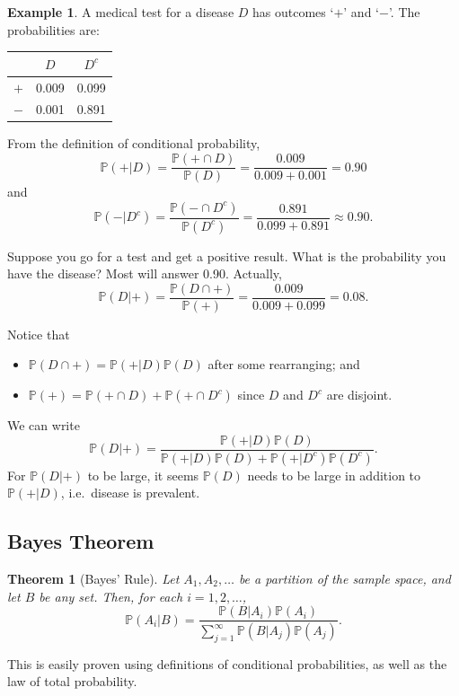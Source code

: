 \documentclass[
]{book}
\providecommand{\tightlist}{%
  \setlength{\itemsep}{0pt}\setlength{\parskip}{0pt}}
\newcommand{\bbP}{\mathbb{P}}
\newtheorem{theorem}{Theorem}[chapter]
\theoremstyle{definition}
\theoremstyle{definition}
\newtheorem{example}{Example}[chapter]
\theoremstyle{definition}
\theoremstyle{definition}
\theoremstyle{remark}
\begin{document}
\begin{example}
A medical test for a disease \(D\) has outcomes `\(+\)' and `\(-\)'. The probabilities are:

\begin{longtable}[]{@{}lcc@{}}
\toprule
& \(D\) & \(D^c\) \\
\midrule
\endhead
\(+\) & 0.009 & 0.099 \\
\(-\) & 0.001 & 0.891 \\
\bottomrule
\end{longtable}

From the definition of conditional probability,
\[
  \bbP(+|D) = \frac{\bbP(+ \cap D)}{\bbP(D)} = \frac{0.009}{0.009 + 0.001} = 0.90
\]
and
\[
  \bbP(-|D^c) = \frac{\bbP(- \cap D^c)}{\bbP(D^c)} = \frac{0.891}{0.099 + 0.891} \approx 0.90.
\]

Suppose you go for a test and get a positive result.
What is the probability you have the disease?
Most will answer 0.90.
Actually,
\[
  \bbP(D|+) = \frac{\bbP(D \cap +)}{\bbP(+)} = \frac{0.009}{0.009 + 0.099} = 0.08.
\]
\end{example}

Notice that

\begin{itemize}
\tightlist
\item
  \(\bbP(D \cap +) = \bbP(+|D)\bbP(D)\) after some rearranging; and
\item
  \(\bbP(+) = \bbP(+ \cap D) + \bbP(+ \cap D^c)\) since \(D\) and \(D^c\) are disjoint.
\end{itemize}

We can write
\[
\bbP(D|+) = \frac{\bbP(+|D)\bbP(D)}{\bbP(+|D)\bbP(D) + \bbP(+|D^c)\bbP(D^c)}.
\]
For \(\bbP(D|+)\) to be large, it seems \(\bbP(D)\) needs to be large in addition to \(\bbP(+|D)\), i.e.~disease is prevalent.

\hypertarget{bayes-theorem}{%
\subsection{Bayes Theorem}\label{bayes-theorem}}

\begin{theorem}[Bayes' Rule]
Let \(A_1,A_2,\dots\) be a partition of the sample space, and let \(B\) be any set.
Then, for each \(i=1,2,\dots\),
\[
  \bbP(A_i|B) = \frac{\bbP(B|A_i)\bbP(A_i)}{\sum_{j=1}^\infty \bbP(B|A_j)\bbP(A_j)}.
\]
\end{theorem}

This is easily proven using definitions of conditional probabilities, as well as the law of total probability.
\end{document}
